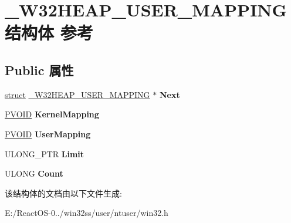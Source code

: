 \hypertarget{struct___w32_h_e_a_p___u_s_e_r___m_a_p_p_i_n_g}{}\section{\+\_\+\+W32\+H\+E\+A\+P\+\_\+\+U\+S\+E\+R\+\_\+\+M\+A\+P\+P\+I\+N\+G结构体 参考}
\label{struct___w32_h_e_a_p___u_s_e_r___m_a_p_p_i_n_g}
\subsection*{Public 属性}
\begin{DoxyCompactItemize}
\item 
\mbox{\label{struct___w32_h_e_a_p___u_s_e_r___m_a_p_p_i_n_g_a4dd485ccaa818281ce2d8e8fc7805582}} 
\hyperlink{interfacestruct}{struct} \hyperlink{struct___w32_h_e_a_p___u_s_e_r___m_a_p_p_i_n_g}{\+\_\+\+W32\+H\+E\+A\+P\+\_\+\+U\+S\+E\+R\+\_\+\+M\+A\+P\+P\+I\+NG} $\ast$ {\bfseries Next}
\item 
\mbox{\label{struct___w32_h_e_a_p___u_s_e_r___m_a_p_p_i_n_g_a238c8be6586342f632d7041f07cb1e89}} 
\hyperlink{interfacevoid}{P\+V\+O\+ID} {\bfseries Kernel\+Mapping}
\item 
\mbox{\label{struct___w32_h_e_a_p___u_s_e_r___m_a_p_p_i_n_g_a80d87e19a6d126ba878e362aab6d3fe2}} 
\hyperlink{interfacevoid}{P\+V\+O\+ID} {\bfseries User\+Mapping}
\item 
\mbox{\label{struct___w32_h_e_a_p___u_s_e_r___m_a_p_p_i_n_g_a7693de41e252468b1ab9cddb20b32eee}} 
U\+L\+O\+N\+G\+\_\+\+P\+TR {\bfseries Limit}
\item 
\mbox{\label{struct___w32_h_e_a_p___u_s_e_r___m_a_p_p_i_n_g_aeeae114d09b08d44c8e91916d3844720}} 
U\+L\+O\+NG {\bfseries Count}
\end{DoxyCompactItemize}


该结构体的文档由以下文件生成\+:\begin{DoxyCompactItemize}
\item 
E\+:/\+React\+O\+S-\/0../win32ss/user/ntuser/win32.\+h\end{DoxyCompactItemize}
